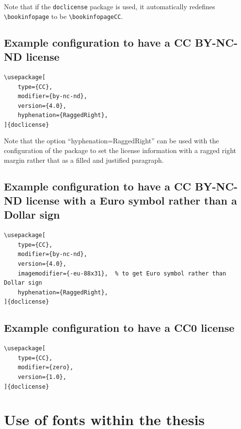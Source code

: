 \documentclass[examplethesis.tex]{subfiles}
\begin{document}
Note that if the \texttt{doclicense} package is used, it automatically redefines \texttt{\textbackslash bookinfopage} to be \texttt{\textbackslash bookinfopageCC}.

\subsection{Example configuration to have a CC BY-NC-ND license}

\begin{lstlisting}[style=latexExampleForAuthors]
\usepackage[
    type={CC},
    modifier={by-nc-nd},
    version={4.0},
    hyphenation={RaggedRight},
]{doclicense}
\end{lstlisting}

Note that the option ``hyphenation={RaggedRight}'' can be used with the configuration of the package to set the license information with a ragged right margin rather that as a filled and justified paragraph.


\subsection{Example configuration to have a CC BY-NC-ND license with a Euro symbol rather than a Dollar sign}

\begin{lstlisting}[style=latexExampleForAuthors]
\usepackage[
    type={CC},
    modifier={by-nc-nd},
    version={4.0},
    imagemodifier={-eu-88x31},  % to get Euro symbol rather than Dollar sign
    hyphenation={RaggedRight},
]{doclicense}
\end{lstlisting}


\subsection{Example configuration to have a CC0 license}

\begin{lstlisting}[style=latexExampleForAuthors]
\usepackage[
    type={CC},
    modifier={zero},
    version={1.0},
]{doclicense}
\end{lstlisting}

\section{Use of fonts within the thesis}
\label{sec:useOfFontsWithinThesis}
\end{document}
